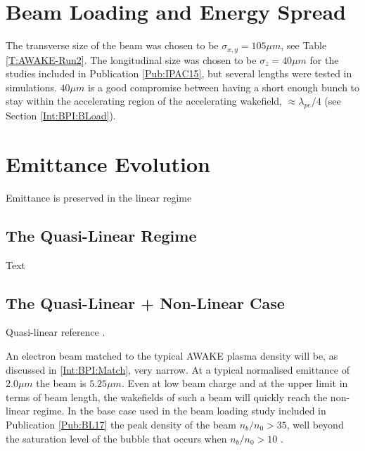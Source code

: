 \section{Beam Loading and Energy Spread}
\label{Sim:BLoad}

The transverse size of the beam was chosen to be $\sigma_{x,y}=105\unit{\mu m}$, see Table \ref{T:AWAKE-Run2}.
The longitudinal size was chosen to be $\sigma_{z}=40\unit{\mu m}$ for the studies included in Publication \ref{Pub:IPAC15}, but several lengths were tested in simulations.
$40\unit{\mu m}$ is a good compromise between having a short enough bunch to stay within the accelerating region of the accelerating wakefield, $\approx \lambda_{pe}/4$ (see Section \ref{Int:BPI:BLoad}).

\section{Emittance Evolution}
\label{Sim:Emitt}

Emittance is preserved in the linear regime

\subsection{The Quasi-Linear Regime}
\label{Sim:QLin}

Text

\subsection{The Quasi-Linear + Non-Linear Case}
\label{Sim:QLinNonLin}

Quasi-linear reference \cite{rosenzweig:2010}.

An electron beam matched to the typical AWAKE plasma density will be, as discussed in \ref{Int:BPI:Match}, very narrow. At a typical normalised emittance of $2.0\unit{\mu m}$ the beam is $5.25\unit{\mu m}$. Even at low beam charge and at the upper limit in terms of beam length, the wakefields of such a beam will quickly reach the non-linear regime. In the base case used in the beam loading study included in Publication \ref{Pub:BL17} \cite{berglyd_olsen:2018} the peak density of the beam $n_b/n_0 > 35$, well beyond the saturation level of the bubble that occurs when $n_b/n_0 > 10$ \cite{lu:2005}.

